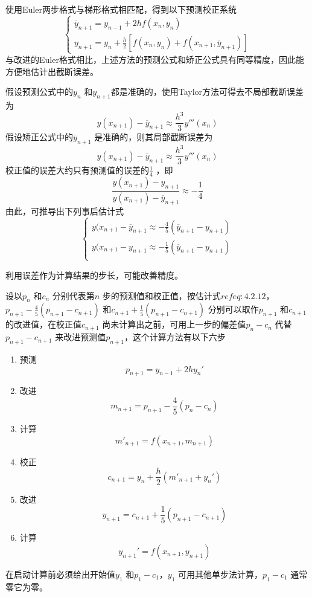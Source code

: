\documentclass[a4paper]{article}
\begin{document}
使用Euler两步格式与梯形格式相匹配，得到以下预测校正系统
\[
	\tag{4.2.9} \label{eq:4.2.9}
	\begin{cases}
		\overline{y}_{n+1} = y_{n-1} + 2 h f(x_{n}, y_{n})  \\
		y_{n+1} = y_{n} + \frac{h}{2} [ f(x_{n}, y_{n}) + f(x_{n+1}, \overline{y}_{n+1})] 
	\end{cases} 
\] 
与改进的Euler格式相比，上述方法的预测公式和矫正公式具有同等精度，因此能方便地估计出截断误差。

假设预测公式中的$y_{n}$ 和$y_{n+1}$都是准确的，使用Taylor方法可得去不局部截断误差为
\[
	y(x_{n+1}) - \overline{y}_{n+1} \approx \frac{h^3}{3}y'''(x_{n}) \tag{4.2.10} \label{eq:4.2.10} 
\] 
假设矫正公式中的$\overline{y}_{n+1}$ 是准确的，则其局部截断误差为
\[
	y(x_{n+1}) - \overline{y}_{n+1} \approx \frac{h^3}{3} y'''(x_{n}) \tag{4.2.11} \label{eq:4.2.11} 
\] 
校正值的误差大约只有预测值的误差的$\frac{1}{4}$ ，即
\[
	\frac{y(x_{n+1}) - y_{n+1}}{y(x_{n+1}) - \overline{y}_{n+1}} \approx - \frac{1}{4}
\] 
由此，可推导出下列事后估计式
\[
	\tag{4.2.12} \label{eq:4.2.12} 
\begin{cases}
	y(x_{n+1} - \overline{y}_{n+1} \approx -\frac{4}{5}(\overline{y}_{n+1} - y_{n+1}) \\	
	y(x_{n+1} - y_{n+1} \approx -\frac{1}{5}(\overline{y}_{n+1} - y_{n+1}) \\	
\end{cases} 
\] 

利用误差作为计算结果的步长，可能改善精度。

设以$p_n$ 和$c_n$ 分别代表第$n$ 步的预测值和校正值，按估计式$ref{eq:4.2.12}$，$p_{n+1} - \frac{4}{5}(p_{n+1} - c_{n+1})$ 和$c_{n+1} + \frac{1}{5} (p_{n+1} - c_{n+1})$ 分别可以取作$p_{n+1}$ 和$c_{n+1}$ 的改进值，在校正值$c_{n+1}$ 尚未计算出之前，可用上一步的偏差值$p_n - c_n$ 代替$p_{n+1} - c_{n+1}$ 来改进预测值$p_{n+1}$，这个计算方法有以下六步
\begin{enumerate}
	\item 预测
		\[
			p_{n+1} = y_{n-1} + 2 h y_{n}'
		\] 
	\item 改进
		\[
			m_{n+1} = p_{n+1} - \frac{4}{5} (p_n - c_n)
		\] 
	\item 计算
		\[
			m'_{n+1} = f(x_{n+1},m_{n+1})
		\] 
	\item 校正
		\[
			c_{n+1} = y_n + \frac{h}{2} (m'_{n+1} + y_{n}')
		\] 
	\item 改进
		\[
			y_{n+1} = c_{n+1} + \frac{1}{5} (p_{n+1} - c_{n+1})
		\] 
	\item 计算
		\[
		y_{n+1}' = f(x_{n+1}, y_{n+1})
		\] 
\end{enumerate}
在启动计算前必须给出开始值$y_1$ 和$p_1-c_1$，$y_1$ 可用其他单步法计算，$p_1-c_1$ 通常零它为零。
\end{document}
